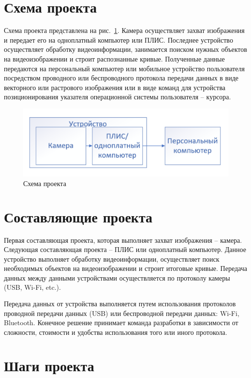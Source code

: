 \documentclass[a4paper,14pt]{article}
\begin{document}
\section{Схема проекта}

Схема проекта представлена на рис.~\ref{fig:schema}.
Камера осуществляет захват изображения и передает его на одноплатный компьютер или ПЛИС.
Последнее устройство осуществляет обработку видеоинформации, занимается поиском нужных объектов на видеоизображении и строит распознанные кривые.
Полученные данные передаются на персональный компьютер или мобильное устройство пользователя посредством проводного или беспроводного протокола передачи данных в виде векторного или растрового изображения или в виде команд для устройства позиционирования указателя операционной системы пользователя -- курсора.

\begin{figure}[H]
	\centering
	\includegraphics[width=\linewidth]{image/schema}
	\caption{Схема проекта}
	\label{fig:schema}
\end{figure}

\section{Составляющие проекта}

Первая составляющая проекта, которая выполняет захват изображения -- камера.
Следующая составляющая проекта -- ПЛИС или одноплатный компьютер.
Данное устройство выполняет обработку видеоинформации, осуществляет поиск необходимых объектов на видеоизображении и строит итоговые кривые.
Передача данных между данными устройствами осуществляется по протоколу камеры (USB, Wi-Fi, etc.).

Передача данных от устройства выполняется путем использования протоколов проводной передачи данных (USB) или беспроводной передачи данных: Wi-Fi, Bluetooth.
Конечное решение принимает команда разработки в зависимости от сложности, стоимости и удобства использования того или иного протокола.

\section{Шаги проекта}
\end{document}
